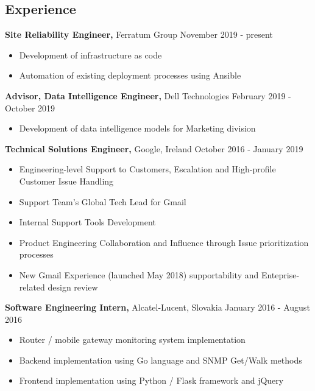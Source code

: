 \documentclass[margin]{res}
\begin{document}
\begin{resume}


\section{Experience}

{\bf Site Reliability Engineer,} Ferratum Group \hfill November 2019 - present
\begin{itemize} \itemsep -2pt
\item Development of infrastructure as code
\item Automation of existing deployment processes using Ansible
\end{itemize}

{\bf Advisor, Data Intelligence Engineer,} Dell Technologies \hfill February 2019 - October 2019
\begin{itemize} \itemsep -2pt
\item Development of data intelligence models for Marketing division
\end{itemize}

{\bf Technical Solutions Engineer,} Google, Ireland \hfill October 2016 - January 2019
\begin{itemize} \itemsep -2pt %
\item Engineering-level Support to Customers, Escalation and High-profile Customer Issue Handling
\item Support Team's Global Tech Lead for Gmail
\item Internal Support Tools Development
\item Product Engineering Collaboration and Influence through Issue prioritization processes
\item New Gmail Experience (launched May 2018) supportability and Enteprise-related design review
\end{itemize}

{\bf Software Engineering Intern,} Alcatel-Lucent, Slovakia \hfill January 2016 - August 2016
\begin{itemize} \itemsep -2pt %
\item Router / mobile gateway monitoring system implementation
\item Backend implementation using Go language and SNMP Get/Walk methods
\item Frontend implementation using Python / Flask framework and jQuery
\end{itemize}


\end{resume}
\end{document}
